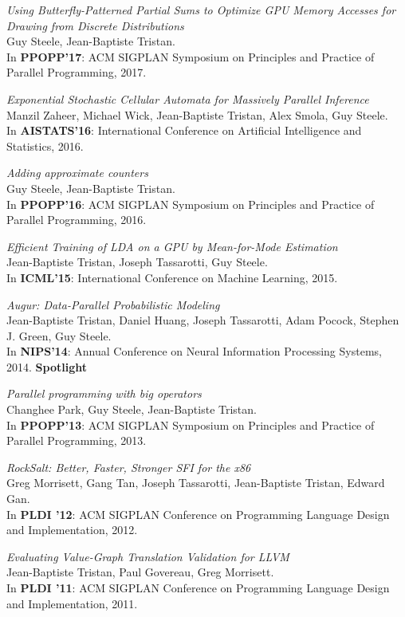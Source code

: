 \documentclass[margin,line]{res}
\begin{document}
\begin{resume}
\emph{Using Butterfly-Patterned Partial Sums to Optimize GPU Memory Accesses for Drawing from Discrete Distributions}\\
Guy Steele, Jean-Baptiste Tristan.\\
In {\bf PPOPP'17}: ACM SIGPLAN Symposium on
Principles and Practice of Parallel Programming, 2017. 

\emph{Exponential Stochastic Cellular Automata for Massively Parallel Inference}\\
Manzil Zaheer, Michael Wick, Jean-Baptiste Tristan, Alex Smola, Guy Steele.\\
In {\bf AISTATS'16}: International Conference on 
Artificial Intelligence and Statistics, 2016. 

\emph{Adding approximate counters}\\
Guy Steele, Jean-Baptiste Tristan.\\
In {\bf PPOPP'16}: ACM SIGPLAN Symposium on
Principles and Practice of Parallel Programming, 2016. 

\emph{Efficient Training of LDA on a GPU by Mean-for-Mode Estimation}\\
Jean-Baptiste Tristan, Joseph Tassarotti, Guy Steele.\\
In {\bf ICML'15}: International Conference on Machine Learning, 2015. 

\emph{Augur: Data-Parallel Probabilistic Modeling}\\
Jean-Baptiste Tristan, Daniel Huang, Joseph Tassarotti, Adam Pocock, Stephen J. Green, Guy Steele.\\
In {\bf NIPS'14}: Annual Conference on Neural Information Processing Systems, 2014. {\bf Spotlight}

\emph{Parallel programming with big operators}\\
Changhee Park, Guy Steele, Jean-Baptiste Tristan.\\
In {\bf PPOPP'13}: ACM SIGPLAN Symposium on
Principles and Practice of Parallel Programming, 2013. 

\emph{RockSalt: Better, Faster, Stronger SFI for the x86}\\
Greg Morrisett, Gang Tan, Joseph Tassarotti, Jean-Baptiste Tristan, Edward Gan.\\
In {\bf PLDI '12}: ACM SIGPLAN Conference on Programming
Language Design and Implementation, 2012. 

\emph{Evaluating Value-Graph Translation Validation for LLVM}\\
Jean-Baptiste Tristan, Paul Govereau, Greg Morrisett.\\
In {\bf PLDI '11}: ACM SIGPLAN Conference on Programming
Language Design and Implementation, 2011. 


\end{resume}
\end{document}
